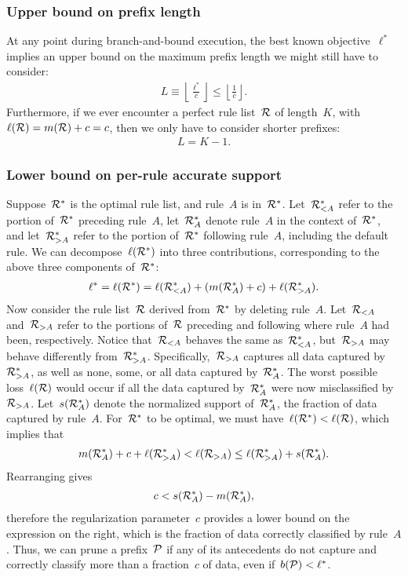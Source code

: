 \subsubsection{Upper bound on prefix length}

At any point during branch-and-bound execution, the best known objective~$\ell^*$
implies an upper bound on the maximum prefix length we might still have to consider:
\begin{align}
L \equiv \left\lfloor \frac{\ell^*}{c} \right\rfloor \le \left\lfloor \frac{1}{c} \right\rfloor.
\end{align}
Furthermore, if we ever encounter a perfect rule list~${\mathcal R}$ of length~$K$,
\ie with~${\ell({\mathcal R}) = m({\mathcal R}) + c = c}$, then we only have to consider shorter prefixes:
\begin{align}
L = K - 1.
\end{align}

\subsubsection{Lower bound on per-rule accurate support}

Suppose~${\mathcal R}^*$ is the optimal rule list, and rule~$A$ is in~${\mathcal R}^*$.
%
Let~${\mathcal R}_{<A}^*$ refer to the portion of~${\mathcal R}^*$ preceding rule~$A$,
let~${\mathcal R}_A^*$ denote rule~$A$ in the context of~${\mathcal R}^*$, and let~${\mathcal R}_{>A}^*$
refer to the portion of~${\mathcal R}^*$ following rule~$A$, including the default rule.
%
We can decompose~$\ell({\mathcal R}^*)$ into three contributions,
corresponding to the above three components of~${\mathcal R}^*$:
\begin{align}
\ell^* = \ell(\RL^*) = \ell(\RL_{<A}^*) + (m(\RL_A^*) + c) + \ell(\RL_{>A}^*).
\end{align}
Now consider the rule list~${\mathcal R}$ derived from~${\mathcal R}^*$ by deleting rule~$A$.
%
Let~${\mathcal R}_{<A}$ and~${\mathcal R}_{>A}$ refer to the portions of~${\mathcal R}$
preceding and following where rule~$A$ had been, respectively.
%
Notice that~${\mathcal R}_{<A}$ behaves the same as~${\mathcal R}_{<A}^*$,
but~${\mathcal R}_{>A}$ may behave differently from~${\mathcal R}_{>A}^*$.
%
Specifically,~${\mathcal R}_{>A}$ captures all data captured by~${\mathcal R}_{>A}^*$, as well as
none, some, or all data captured by~${\mathcal R}_A^*$.
%
The worst possible loss~$\ell({\mathcal R})$ would occur if all the data
captured by~${\mathcal R}_A^*$ were now misclassified by~${\mathcal R}_{>A}$.
%
Let~$s({\mathcal R}_A^*)$ denote the normalized support of~${\mathcal R}_A^*$,
\ie the fraction of data captured by rule~$A$.
%
For~${\mathcal R}^*$ to be optimal, we must have~${\ell({\mathcal R}^*) < \ell({\mathcal R})}$, which implies that
\begin{align}
m(\RL_A^*) + c + \ell(\RL_{>A}^*) < \ell(\RL_{>A}) \le \ell(\RL_{>A}^*) + s(\RL_A^*).
\end{align}
Rearranging gives
\begin{align}
c < s(\RL_A^*) - m(\RL_A^*),
\label{eq:min-capture-correct}
\end{align}
therefore the regularization parameter~$c$ provides a lower bound on the expression
on the right, which is the fraction of data correctly classified by rule~$A$.
%
Thus, we can prune a prefix~${\mathcal P}$ if any of its antecedents do not capture and
correctly classify more than a fraction~$c$ of data, even if~${b({\mathcal P}) < \ell^*}$.

